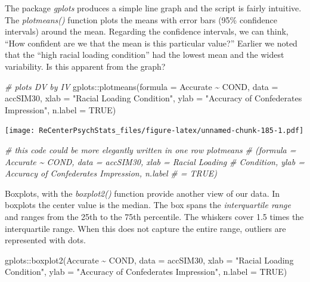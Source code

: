 \documentclass[
  11pt,
]{book}
\newenvironment{Shaded}{\begin{snugshade}}{\end{snugshade}}
\newcommand{\AttributeTok}[1]{\textcolor[rgb]{0.77,0.63,0.00}{#1}}
\newcommand{\CommentTok}[1]{\textcolor[rgb]{0.56,0.35,0.01}{\textit{#1}}}
\newcommand{\ConstantTok}[1]{\textcolor[rgb]{0.00,0.00,0.00}{#1}}
\newcommand{\FunctionTok}[1]{\textcolor[rgb]{0.00,0.00,0.00}{#1}}
\newcommand{\NormalTok}[1]{#1}
\newcommand{\SpecialCharTok}[1]{\textcolor[rgb]{0.00,0.00,0.00}{#1}}
\newcommand{\StringTok}[1]{\textcolor[rgb]{0.31,0.60,0.02}{#1}}
\begin{document}
The package \emph{gplots} produces a simple line graph and the script is fairly intuitive. The \emph{plotmeans()} function plots the means with error bars (95\% confidence intervals) around the mean. Regarding the confidence intervals, we can think, ``How confident are we that the mean is this particular value?'' Earlier we noted that the ``high racial loading condition'' had the lowest mean and the widest variability. Is this apparent from the graph?

\begin{Shaded}
\begin{Highlighting}[]
\CommentTok{\# plots DV by IV}
\NormalTok{gplots}\SpecialCharTok{::}\FunctionTok{plotmeans}\NormalTok{(}\AttributeTok{formula =}\NormalTok{ Accurate }\SpecialCharTok{\textasciitilde{}}\NormalTok{ COND, }\AttributeTok{data =}\NormalTok{ accSIM30, }\AttributeTok{xlab =} \StringTok{"Racial Loading Condition"}\NormalTok{,}
    \AttributeTok{ylab =} \StringTok{"Accuracy of Confederate\textquotesingle{}s Impression"}\NormalTok{, }\AttributeTok{n.label =} \ConstantTok{TRUE}\NormalTok{)}
\end{Highlighting}
\end{Shaded}

\texttt{[image: ReCenterPsychStats\_files/figure-latex/unnamed-chunk-185-1.pdf]}

\begin{Shaded}
\begin{Highlighting}[]
\CommentTok{\# this code could be more elegantly written in one row plotmeans}
\CommentTok{\# (formula = Accurate \textasciitilde{} COND, data = accSIM30, xlab = \textquotesingle{}Racial Loading}
\CommentTok{\# Condition\textquotesingle{}, ylab = \textquotesingle{}Accuracy of Confederate\textquotesingle{}s Impression\textquotesingle{}, n.label}
\CommentTok{\# = TRUE)}
\end{Highlighting}
\end{Shaded}

Boxplots, with the \emph{boxplot2()} function provide another view of our data. In boxplots the center value is the median. The box spans the \emph{interquartile range} and ranges from the 25th to the 75th percentile. The whiskers cover 1.5 times the interquartile range. When this does not capture the entire range, outliers are represented with dots.

\begin{Shaded}
\begin{Highlighting}[]
\NormalTok{gplots}\SpecialCharTok{::}\FunctionTok{boxplot2}\NormalTok{(Accurate }\SpecialCharTok{\textasciitilde{}}\NormalTok{ COND, }\AttributeTok{data =}\NormalTok{ accSIM30, }\AttributeTok{xlab =} \StringTok{"Racial Loading Condition"}\NormalTok{,}
    \AttributeTok{ylab =} \StringTok{"Accuracy of Confederate\textquotesingle{}s Impression"}\NormalTok{, }\AttributeTok{n.label =} \ConstantTok{TRUE}\NormalTok{)}
\end{Highlighting}
\end{Shaded}
\end{document}
